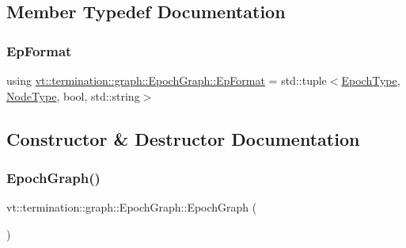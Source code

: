 \subsection{Member Typedef Documentation}
\mbox{\label{structvt_1_1termination_1_1graph_1_1_epoch_graph_a127b9f54d98b9645451c2d9a2821d10e}} 
\subsubsection{\texorpdfstring{Ep\+Format}{EpFormat}}
{\footnotesize\ttfamily using \hyperlink{structvt_1_1termination_1_1graph_1_1_epoch_graph_a127b9f54d98b9645451c2d9a2821d10e}{vt\+::termination\+::graph\+::\+Epoch\+Graph\+::\+Ep\+Format} =  std\+::tuple$<$\hyperlink{namespacevt_a81d11b28122d43bf9834577e4a06440f}{Epoch\+Type}, \hyperlink{namespacevt_a866da9d0efc19c0a1ce79e9e492f47e2}{Node\+Type}, bool, std\+::string$>$}



\subsection{Constructor \& Destructor Documentation}
\mbox{\label{structvt_1_1termination_1_1graph_1_1_epoch_graph_a2ad0e6af761b4ff43605ad9d3f33d709}} 
\subsubsection{\texorpdfstring{Epoch\+Graph()}{EpochGraph()}\hspace{0.1cm}{\footnotesize\ttfamily [1/4]}}
{\footnotesize\ttfamily vt\+::termination\+::graph\+::\+Epoch\+Graph\+::\+Epoch\+Graph (\begin{DoxyParamCaption}{ }\end{DoxyParamCaption})\hspace{0.3cm}{\ttfamily [default]}}


